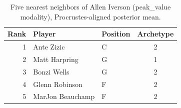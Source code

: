 \begin{table}[htbp]
  \centering\small
  \begin{tabular}{rllc}
    \toprule
    Rank & Player & Position & Archetype \\
    \midrule
    1 & Ante Zizic & C & 2 \\
    2 & Matt Harpring & G & 1 \\
    3 & Bonzi Wells & G & 2 \\
    4 & Glenn Robinson & F & 2 \\
    5 & MarJon Beauchamp & F & 2 \\
    \bottomrule
  \end{tabular}
  \caption{Five nearest neighbors of Allen Iverson (peak_value modality), Procrustes-aligned posterior mean.}
  \label{tab:Allen_Iverson_neighbors_peak_value}
\end{table}

